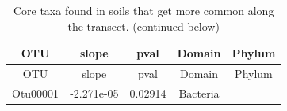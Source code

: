 \documentclass[]{article}
\begin{document}
\begin{longtable}[]{@{}ccccc@{}}
\caption{Core taxa found in soils that get more common along the
transect. (continued below)}\tabularnewline
\toprule
\begin{minipage}[b]{0.13\columnwidth}\centering\strut
OTU\strut
\end{minipage} & \begin{minipage}[b]{0.16\columnwidth}\centering\strut
slope\strut
\end{minipage} & \begin{minipage}[b]{0.14\columnwidth}\centering\strut
pval\strut
\end{minipage} & \begin{minipage}[b]{0.13\columnwidth}\centering\strut
Domain\strut
\end{minipage} & \begin{minipage}[b]{0.27\columnwidth}\centering\strut
Phylum\strut
\end{minipage}\tabularnewline
\midrule
\endfirsthead
\toprule
\begin{minipage}[b]{0.13\columnwidth}\centering\strut
OTU\strut
\end{minipage} & \begin{minipage}[b]{0.16\columnwidth}\centering\strut
slope\strut
\end{minipage} & \begin{minipage}[b]{0.14\columnwidth}\centering\strut
pval\strut
\end{minipage} & \begin{minipage}[b]{0.13\columnwidth}\centering\strut
Domain\strut
\end{minipage} & \begin{minipage}[b]{0.27\columnwidth}\centering\strut
Phylum\strut
\end{minipage}\tabularnewline
\midrule
\endhead
\begin{minipage}[t]{0.13\columnwidth}\centering\strut
Otu00001\strut
\end{minipage} & \begin{minipage}[t]{0.16\columnwidth}\centering\strut
-2.271e-05\strut
\end{minipage} & \begin{minipage}[t]{0.14\columnwidth}\centering\strut
0.02914\strut
\end{minipage} & \begin{minipage}[t]{0.13\columnwidth}\centering\strut
Bacteria\strut
\end{minipage} & \begin{minipage}[t]{0.27\columnwidth}\centering\strut

\end{minipage}
\end{longtable}
\end{document}
